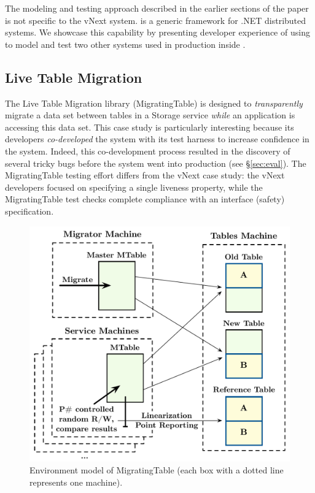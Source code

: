 The modeling and testing approach described in the earlier sections of the paper is not specific to the vNext system. \psharp is a generic framework for .NET distributed systems. We showcase this capability by presenting developer experience of using \psharp to model and test two other systems used in production inside \Microsoft.

\subsection{Live Table Migration}
\label{sec:cases:migration}

The Live Table Migration library (MigratingTable) is designed to \emph{transparently} migrate a data set between tables in a
\Azure Storage service \emph{while} an application is accessing this data set. This case study is particularly interesting because its developers \emph{co-developed} the system with its \psharp test harness to increase confidence in the system. Indeed, this co-development process resulted in the discovery of several tricky bugs before the system went into production (see \S\ref{sec:eval}). The MigratingTable testing effort differs from the vNext case study: the vNext developers focused on specifying a single liveness property, while the MigratingTable test checks complete compliance with an interface (safety) specification.

\begin{figure}[t]
\centering
\includegraphics[width=\linewidth]{img/mocked_migration}
\caption{Environment model of MigratingTable (each box with a dotted line represents one \psharp machine).}
\label{fig:mockedmigration}
\end{figure}

